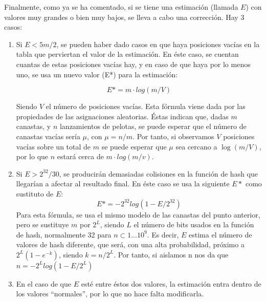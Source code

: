Finalmente, como ya se ha comentado, si se tiene una estimación (llamada $E$) con valores muy
grandes o bien muy bajos, se lleva a cabo una corrección. Hay 3 casos:

\begin{enumerate}
\item Si $E < 5m/2$, se pueden haber dado casos en que haya posiciones vacías en la tabla que
perviertan el valor de la estimación. En éste caso, se cuentan cuantas de estas posiciones vacías
hay, y en caso de que haya por lo menos uno, se usa un nuevo valor (E*) para la estimación: 

$$E* = m \cdot log(m/V)$$

Siendo $V$ el número de posiciones vacías. Esta fórmula viene dada por las propiedades de las
asignaciones aleatorias. Éstas indican que, dadas $m$ canastas, y $n$ lanzamientos de pelotas,
se puede esperar que el número de canastas vacías sería $\mu$, con $\mu = n / m$. Por tanto, si
observamos $V$ posiciones vacías sobre un total de $m$
se puede esperar que $\mu$ sea cercano a $\log(m/V)$, por lo que $n$ estará cerca de
$m \cdot log(m/v)$.

\item Si $E > 2^{32}/30$, se producirán demasiadas colisiones en la función de hash que llegarían a
afectar al resultado final. En éste caso se usa la siguiente $E*$ como sustituto de $E$:
$$E* = -2^{32}log(1-E/2^{32})$$
Para esta fórmula, se usa el mismo modelo de las canastas del punto anterior, pero se sustituye $m$
por $2^L$, siendo $L$ el número de bits usados en la función de hash, normalmente 32 para $n
\subset 1...10^9$. Es decir, $E$ estima el número de valores de hash diferente, que será, con una
alta probabilidad, próximo a $2^L(1-e^{-k})$, siendo $k = n/2^L$. Por tanto, si aislamos n nos da
que 
$n=-2^Llog(1-E/2^L)$

\item En el caso de que $E$ esté entre éstos dos valores, la estimación entra dentro de los valores
“normales”, por lo que no hace falta modificarla.

\end{enumerate}
